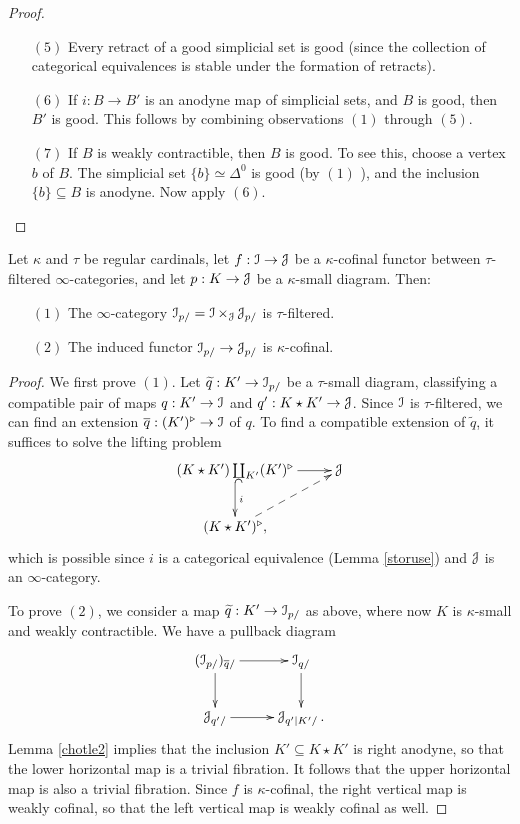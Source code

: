 \begin{proof}
\begin{itemize}
\item[$(5)$] Every retract of a good simplicial set is good (since the collection of categorical equivalences is stable under the formation of retracts).

\item[$(6)$] If $i: B \rightarrow B'$ is an anodyne map of simplicial sets, and $B$ is good, then $B'$ is good. This follows by combining observations $(1)$ through $(5)$.

\item[$(7)$] If $B$ is weakly contractible, then $B$ is good. To see this, choose a vertex
$b$ of $B$. The simplicial set $\{b\} \simeq \Delta^0$ is good (by $(1)$ ), and the inclusion
$\{b\} \subseteq B$ is anodyne. Now apply $(6)$.
\end{itemize}
\end{proof}

\begin{lemma}\label{wolfpup}
Let $\kappa$ and $\tau$ be regular cardinals, let
$f: \operatorname{\mathcal{I}} \rightarrow \operatorname{\mathcal{J}}$ be a $\kappa$-cofinal functor between $\tau$-filtered $\infty$-categories, and let $p: K \rightarrow \operatorname{\mathcal{J}}$ be a $\kappa$-small diagram. Then:
\begin{itemize}
\item[$(1)$] The $\infty$-category $\operatorname{\mathcal{I}}_{p/} = \operatorname{\mathcal{I}} \times_{\operatorname{\mathcal{J}}} \operatorname{\mathcal{J}}_{p/}$ is $\tau$-filtered.

\item[$(2)$] The induced functor $\operatorname{\mathcal{I}}_{p/} \rightarrow \operatorname{\mathcal{J}}_{p/}$ is $\kappa$-cofinal.
\end{itemize}

\end{lemma}

\begin{proof}
We first prove $(1)$. Let $\widetilde{q}: K' \rightarrow \operatorname{\mathcal{I}}_{p/}$ be a $\tau$-small diagram, classifying a compatible pair of maps $q: K' \rightarrow \operatorname{\mathcal{I}}$ and $q': K \star K' \rightarrow \operatorname{\mathcal{J}}$.
Since $\operatorname{\mathcal{I}}$ is $\tau$-filtered, we can find an extension $\overline{q}: (K')^{\triangleright} \rightarrow \operatorname{\mathcal{I}}$ of $q$. To find a compatible extension of $\widetilde{q}$, it suffices to solve the lifting problem
$$ \xymatrix{ (K \star K') \coprod_{ K'} (K')^{\triangleright} \ar@{^{(}->}[d]^{i} \ar[r] & \calJ \\
(K \star K')^{\triangleright}, \ar@{-->}[ur] & } $$
which is possible since $i$ is a categorical equivalence (Lemma \ref{storuse}) and $\operatorname{\mathcal{J}}$ is an $\infty$-category.

To prove $(2)$, we consider a map $\widetilde{q}: K' \rightarrow \operatorname{\mathcal{I}}_{p/}$ as above, where
now $K$ is $\kappa$-small and weakly contractible. 
We have a pullback diagram
$$ \xymatrix{ (\calI_{p/})_{\overline{q}/} \ar[r] \ar[d] & \calI_{q/} \ar[d] \\
\calJ_{q'/} \ar[r] & \calJ_{q'|K'/}. }$$
Lemma \ref{chotle2} implies that the inclusion $K' \subseteq K \star K'$ is right anodyne, 
so that the lower horizontal map is a trivial fibration. It follows that the upper horizontal map
is also a trivial fibration. Since $f$ is $\kappa$-cofinal, the right vertical map is weakly cofinal, so that the left vertical map is weakly cofinal as well.
\end{proof}

